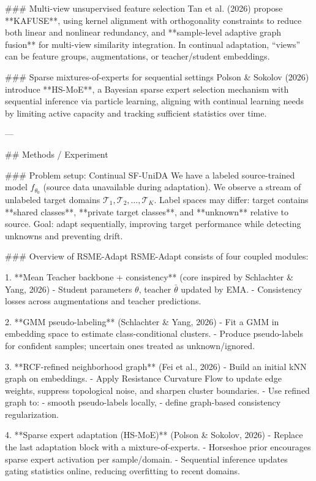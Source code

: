### Multi-view unsupervised feature selection  
Tan et al. (2026) propose **KAFUSE**, using kernel alignment with orthogonality constraints to reduce both linear and nonlinear redundancy, and **sample-level adaptive graph fusion** for multi-view similarity integration. In continual adaptation, “views” can be feature groups, augmentations, or teacher/student embeddings.

### Sparse mixtures-of-experts for sequential settings  
Polson & Sokolov (2026) introduce **HS-MoE**, a Bayesian sparse expert selection mechanism with sequential inference via particle learning, aligning with continual learning needs by limiting active capacity and tracking sufficient statistics over time.

---

## Methods / Experiment  

### Problem setup: Continual SF-UniDA  
We have a labeled source-trained model \( f_{\theta_0} \) (source data unavailable during adaptation). We observe a stream of unlabeled target domains \( \mathcal{T}_1, \mathcal{T}_2, \dots, \mathcal{T}_K \). Label spaces may differ: target contains **shared classes**, **private target classes**, and **unknown** relative to source. Goal: adapt sequentially, improving target performance while detecting unknowns and preventing drift.

### Overview of RSME-Adapt  
RSME-Adapt consists of four coupled modules:

1. **Mean Teacher backbone + consistency** (core inspired by Schlachter & Yang, 2026)  
   - Student parameters \(\theta\), teacher \(\bar{\theta}\) updated by EMA.
   - Consistency losses across augmentations and teacher predictions.

2. **GMM pseudo-labeling** (Schlachter & Yang, 2026)  
   - Fit a GMM in embedding space to estimate class-conditional clusters.
   - Produce pseudo-labels for confident samples; uncertain ones treated as unknown/ignored.

3. **RCF-refined neighborhood graph** (Fei et al., 2026)  
   - Build an initial kNN graph on embeddings.
   - Apply Resistance Curvature Flow to update edge weights, suppress topological noise, and sharpen cluster boundaries.
   - Use refined graph to:
     - smooth pseudo-labels locally,
     - define graph-based consistency regularization.

4. **Sparse expert adaptation (HS-MoE)** (Polson & Sokolov, 2026)  
   - Replace the last adaptation block with a mixture-of-experts.
   - Horseshoe prior encourages sparse expert activation per sample/domain.
   - Sequential inference updates gating statistics online, reducing overfitting to recent domains.

